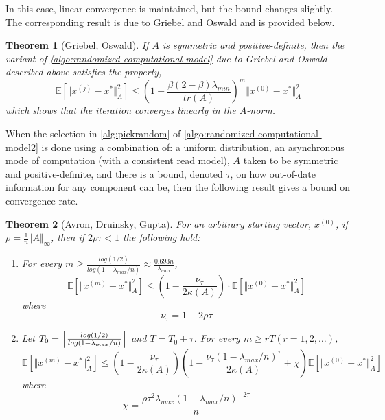 \documentclass{article}
\newtheorem{theorem}{Theorem}
\theoremstyle{definition}
\theoremstyle{example}
\theoremstyle{example}
\theoremstyle{example}
\DeclarePairedDelimiter\ceil{\lceil}{\rceil}
\begin{document}
In this case, linear convergence is maintained, but the bound changes slightly. The corresponding result is due to Griebel and Oswald \cite{griebel2012greedy} and is provided below.

\begin{theorem}[Griebel, Oswald]
	If $A$ is symmetric and positive-definite, then the variant of \cref{algo:randomized-computational-model} due to Griebel and Oswald described above satisfies the property,
		\begin{equation}
			\mathbb{E}[\Vert x^{(j)} - x^* \Vert_A^2] \leq \left(1 - \frac{\beta (2 - \beta)\lambda_{min}}{tr(A)}\right)^m \Vert x^{(0)} - x^* \Vert_A^2
		\end{equation}
	which shows that the iteration converges linearly in the $A$-norm.
\end{theorem}
	

When the selection in \cref{alg:pickrandom} of \cref{algo:randomized-computational-model2} is done using a combination of: a uniform distribution, an asynchronous mode of computation (with a consistent read model), $A$ taken to be symmetric and positive-definite, and there is a bound, denoted $\tau$, on how out-of-date information for any component can be, then the following result gives a bound on convergence rate.

\begin{theorem}[Avron, Druinsky, Gupta]
	For an arbitrary starting vector, $x^{(0)}$, if $\rho = \frac{1}{n} \Vert A \Vert_\infty$, then if $2\rho \tau < 1$ the following hold:
		\begin{enumerate}
			\item For every $m \geq \frac{log(1/2)}{log(1-\lambda_{max}/n)} \approx \frac{0.693n}{\lambda_{max}}$,
					\begin{equation}
						\mathbb{E}[\Vert x^{(m)} - x^* \Vert_A^2] \leq \left( 1 - \frac{\nu_\tau}{2\kappa(A)}\right) \cdot \mathbb{E}[\Vert x^{(0)} - x^* \Vert_A^2]
					\end{equation}
				where
					\begin{equation}
						\nu_\tau = 1 - 2 \rho \tau
					\end{equation}
			\item Let $T_0 = \ceil*{\frac{log(1/2)}{log(1 - \lambda_{max}/n)}}$ and $T = T_0 + \tau$. For every $m \geq rT (r = 1, 2, \ldots)$,
					\begin{equation}
						\mathbb{E}[\Vert x^{(m)} - x^* \Vert_A^2] \leq \left( 1 - \frac{\nu_\tau}{2\kappa(A)}\right) \left( 1 - \frac{\nu_\tau(1 - \lambda_{max}/n)^\tau}{2\kappa(A)} + \chi \right) \mathbb{E}[\Vert x^{(0)} - x^* \Vert_A^2]
					\end{equation}
				where 
					\begin{equation}
						\chi = \frac{\rho \tau^2 \lambda_{max}(1 - \lambda_{max}/n)^{-2\tau}}{n}
					\end{equation}			
			\end{enumerate}
\end{theorem}
\end{document}
